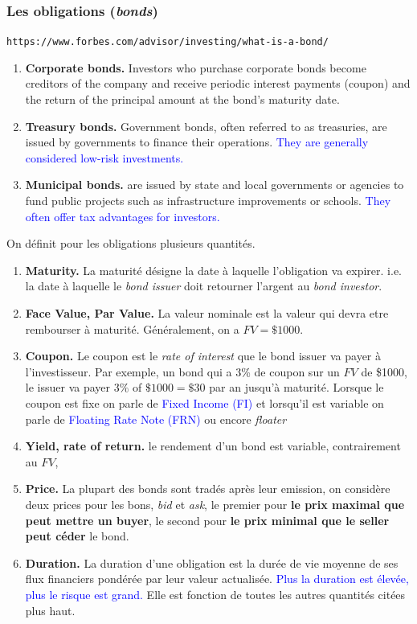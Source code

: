 \documentclass[a4paper]{article}
\begin{document}
\subsubsection{Les obligations (\textit{bonds})}
\texttt{https://www.forbes.com/advisor/investing/what-is-a-bond/}
 \begin{enumerate}
        \item \textbf{Corporate bonds.} Investors who purchase corporate bonds become creditors of the company and receive periodic interest payments (coupon) and the return of the principal amount at the bond's maturity date.
        \item \textbf{Treasury bonds.} Government bonds, often referred to as treasuries, are issued by governments to finance their operations. \textcolor{blue}{They are generally considered low-risk investments.}
        \item \textbf{Municipal bonds.} are issued by state and local governments or agencies to fund public projects such as infrastructure improvements or schools. \textcolor{blue}{They often offer tax advantages for investors.}
\end{enumerate}
On définit pour les obligations plusieurs quantités.
\begin{enumerate}
    \item \textbf{Maturity.} La maturité désigne la date à laquelle l'obligation va expirer. i.e. la date à laquelle le \textit{bond issuer} doit retourner l'argent au \textit{bond investor}.
    \item \textbf{Face Value, Par Value.} La valeur nominale est la valeur qui devra etre rembourser à maturité. Généralement, on a $FV = \$ 1000$.
    \item \textbf{Coupon.} Le coupon est le \textit{rate of interest} que le bond issuer va payer à l'investisseur. Par exemple, un bond qui a 3\% de coupon sur un $FV$ de \$1000, le issuer va payer $3\%$ of $\$ 1000 = \$30$ par an jusqu'à maturité.
    Lorsque le coupon est fixe on parle de \textcolor{blue}{Fixed Income (FI)} et lorsqu'il est variable on parle de \textcolor{blue}{Floating Rate Note (FRN)} ou encore \textit{floater}
    \item \textbf{Yield, rate of return.} le rendement d'un bond est variable, contrairement au $FV$,
    \item \textbf{Price.} La plupart des bonds sont tradés après leur emission, on considère deux prices pour les bons, \textit{bid} et \textit{ask}, le premier pour \textbf{le prix maximal que peut mettre un buyer}, le second pour \textbf{le prix minimal que le seller peut céder} le bond.
    \item \textbf{Duration.} La duration d'une obligation est la durée de vie moyenne de ses flux financiers pondérée par leur valeur actualisée. \textcolor{blue}{Plus la duration est élevée, plus le risque est grand.} Elle est fonction de toutes les autres quantités citées plus haut.
\end{enumerate}
\end{document}
